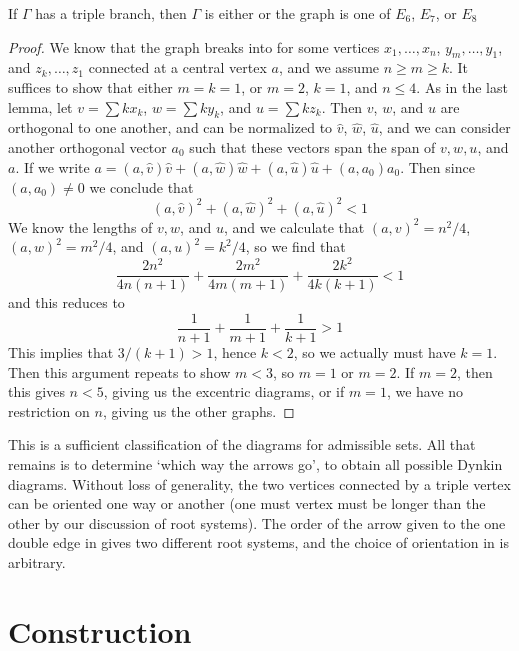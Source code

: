 \begin{lemma}
    If $\Gamma$ has a triple branch, then $\Gamma$ is either
    or the graph is one of $E_6$, $E_7$, or $E_8$
\end{lemma}
\begin{proof}
    We know that the graph breaks into
    for some vertices $x_1, \dots, x_n$, $y_m, \dots, y_1$, and $z_k, \dots, z_1$ connected at a central vertex $a$, and we assume $n \geq m \geq k$. It suffices to show that either $m = k = 1$, or $m = 2$, $k = 1$, and $n \leq 4$. As in the last lemma, let $v = \sum k x_k$, $w = \sum k y_k$, and $u = \sum k z_k$. Then $v$, $w$, and $u$ are orthogonal to one another, and can be normalized to $\hat{v}$, $\hat{w}$, $\hat{u}$, and we can consider another orthogonal vector $a_0$ such that these vectors span the span of $v,w,u$, and $a$. If we write $a = (a,\hat{v}) \hat{v} + (a,\hat{w}) \hat{w} + (a, \hat{u}) \hat{u} + (a,a_0) a_0$. Then since $(a,a_0) \neq 0$ we conclude that
    \[ (a,\hat{v})^2 + (a, \hat{w})^2 + (a, \hat{u})^2 < 1 \]
    We know the lengths of $v,w$, and $u$, and we calculate that $(a,v)^2 = n^2/4$, $(a,w)^2 = m^2/4$, and $(a,u)^2 = k^2/4$, so we find that
    \[ \frac{2n^2}{4n(n+1)} + \frac{2m^2}{4m(m+1)} + \frac{2k^2}{4k(k+1)} < 1 \]
    and this reduces to
    \[ \frac{1}{n + 1} + \frac{1}{m+1} + \frac{1}{k + 1} > 1 \]
    This implies that $3/(k+1) > 1$, hence $k < 2$, so we actually must have $k = 1$. Then this argument repeats to show $m < 3$, so $m = 1$ or $m = 2$. If $m = 2$, then this gives $n < 5$, giving us the excentric diagrams, or if $m = 1$, we have no restriction on $n$, giving us the other graphs.
\end{proof}

This is a sufficient classification of the diagrams for admissible sets. All that remains is to determine `which way the arrows go', to obtain all possible Dynkin diagrams. Without loss of generality, the two vertices connected by a triple vertex can be oriented one way or another (one must vertex must be longer than the other by our discussion of root systems). The order of the arrow given to the one double edge in
%
gives two different root systems, and the choice of orientation in
%
is arbitrary.

\section{Construction}

